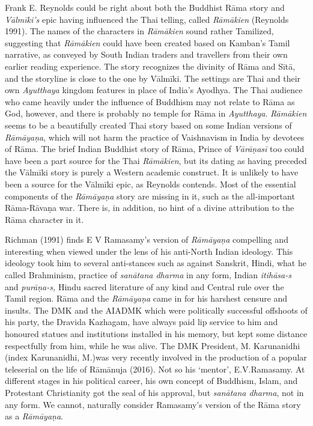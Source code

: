  \item Frank E. Reynolds could be right about both the Buddhist Rāma story and \textit{Vālmīki’s} epic having influenced the Thai telling, called \textit{Rāmākien} (Reynolds 1991). The names of the characters in \textit{Rāmākien} sound rather Tamilized, suggesting that \textit{Rāmākien} could have been created based on Kamban’s Tamil narrative, as conveyed by South Indian traders and travellers from their own earlier reading experience. The story recognizes the divinity of Rāma and Sītā, and the storyline is close to the one by Vālmīki. The settings are Thai and their own \textit{Ayutthaya} kingdom features in place of India’s Ayodhya. The Thai audience who came heavily under the influence of Buddhism may not relate to Rāma as God, however, and there is probably no temple for Rāma in \textit{Ayutthaya}. \textit{Rāmākien} seems to be a beautifully created Thai story based on some Indian versions of \textit{Rāmāyaṇa}, which will not harm the practice of Vaishnavism in India by devotees of Rāma. The brief Indian Buddhist story of Rāma, Prince of \textit{Vārāṇasī} too could have been a part source for the Thai \textit{Rāmākien}, but its dating as having preceded the Vālmīki story is purely a Western academic construct. It is unlikely to have been a source for the Vālmīki epic, as Reynolds contends. Most of the essential components of the \textit{Rāmāyaṇa} story are missing in it, such as the all-important Rāma-Rāvaṇa war. There is, in addition, no hint of a divine attribution to the Rāma character in it.

 \item Richman (1991) finds E V Ramasamy’s version of \textit{Rāmāyaņa} compelling and interesting when viewed under the lens of his anti-North Indian ideology. This ideology took him to several anti-stances such as against Sanskrit, Hindi, what he called Brahminism, practice of \textit{sanātana dharma} in any form, Indian \textit{itihāsa-s} and \textit{purāṇa-s,} Hindu sacred literature of any kind and Central rule over the Tamil region. Rāma and the \textit{Rāmāyaṇa} came in for his harshest censure and insults. The DMK and the AIADMK which were politically successful offshoots of his party, the Dravida Kazhagam, have always paid lip service to him and honoured statues and institutions installed in his memory, but kept some distance respectfully from him, while he was alive. The DMK President, M. Karunanidhi (index Karunanidhi, M.)was very recently involved in the production of a popular teleserial on the life of Rāmānuja (2016). Not so his ‘mentor’, E.V.Ramasamy. At different stages in his political career, his own concept of Buddhism, Islam, and Protestant Christianity got the seal of his approval, but \textit{sanātana dharma}, not in any form. We cannot, naturally consider Ramasamy’s version of the Rāma story as a \textit{Rāmāyaṇa}.

